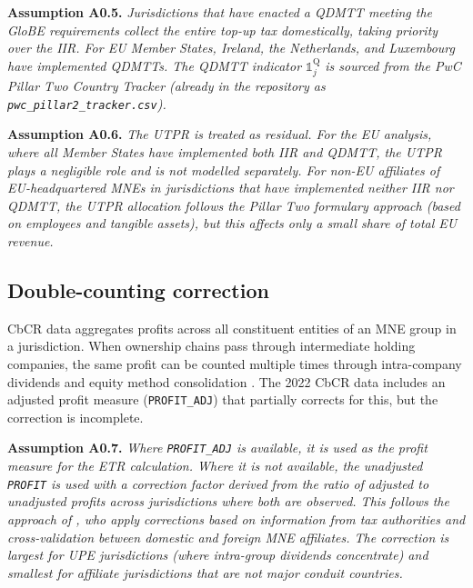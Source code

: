 \documentclass[11pt,a4paper]{article}
\newcommand{\code}[1]{\texttt{#1}}
\newcommand{\assumption}[2]{\noindent\textbf{Assumption #1.} \textit{#2}\medskip}
\begin{document}
\assumption{A0.5}{Jurisdictions that have enacted a QDMTT meeting the GloBE requirements collect the entire top-up tax domestically, taking priority over the IIR. For EU Member States, Ireland, the Netherlands, and Luxembourg have implemented QDMTTs. The QDMTT indicator $\mathbb{1}_j^{\text{Q}}$ is sourced from the PwC Pillar Two Country Tracker (already in the repository as \code{pwc\_pillar2\_tracker.csv}).}

\assumption{A0.6}{The UTPR is treated as residual. For the EU analysis, where all Member States have implemented both IIR and QDMTT, the UTPR plays a negligible role and is not modelled separately. For non-EU affiliates of EU-headquartered MNEs in jurisdictions that have implemented neither IIR nor QDMTT, the UTPR allocation follows the Pillar Two formulary approach (based on employees and tangible assets), but this affects only a small share of total EU revenue.}

\subsection{Double-counting correction}\label{sec:doublecounting}

CbCR data aggregates profits across all constituent entities of an MNE group in a jurisdiction. When ownership chains pass through intermediate holding companies, the same profit can be counted multiple times through intra-company dividends and equity method consolidation \citep{blouin2023}. The 2022 CbCR data includes an adjusted profit measure (\code{PROFIT\_ADJ}) that partially corrects for this, but the correction is incomplete.

\assumption{A0.7}{Where \code{PROFIT\_ADJ} is available, it is used as the profit measure for the ETR calculation. Where it is not available, the unadjusted \code{PROFIT} is used with a correction factor derived from the ratio of adjusted to unadjusted profits across jurisdictions where both are observed. This follows the approach of \citet{hugger2025}, who apply corrections based on information from tax authorities and cross-validation between domestic and foreign MNE affiliates. The correction is largest for UPE jurisdictions (where intra-group dividends concentrate) and smallest for affiliate jurisdictions that are not major conduit countries.}
\end{document}

